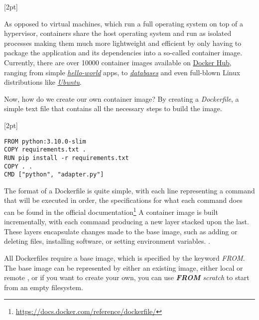 [2pt]

As opposed to virtual machines, which run a full operating system on top of a hypervisor, containers share the host operating system and run as isolated processes
making them much more lightweight and efficient by only having to package the application and its dependencies into a so-called container image.
Currently, there are over 10000 container images available on \href{https://hub.docker.com/}{Docker Hub}, ranging from simple \href{https://hub.docker.com/_/hello-world}{\textit{hello-world}} apps, to 
\href{https://hub.docker.com/search?categories=Databases+\%26+Storage}{\textit{databases}} and even full-blown Linux distributions like \href{https://hub.docker.com/_/ubuntu}{\textit{Ubuntu}}.

Now, how do we create our own container image? By creating a \textit{Dockerfile}, a simple text file that contains all the necessary steps to build the image.

[2pt]

\lstset{language=Dockerfile,caption=Sample Dockerfile,label=lst:ex-dockerfile}
\begin{lstlisting}
FROM python:3.10.0-slim
COPY requirements.txt .
RUN pip install -r requirements.txt
COPY . .
CMD ["python", "adapter.py"]    
\end{lstlisting}

The format of a Dockerfile is quite simple, with each line representing a command that will be executed in order, the specifications for what each command does can be found in the official documentation\footnote[1]{\href{https://docs.docker.com/reference/dockerfile/}{https://docs.docker.com/reference/dockerfile/}}
A container image is built incrementally, with each command producing a new layer stacked upon the last. These layers encapsulate changes made to the base image, such as adding or deleting files, installing software, or setting environment variables. \cite{image-layers}.


All Dockerfiles require a base image, which is specified by the keyword \textit{FROM}.
The base image can be represented by either an existing image, either local or remote , or if you want to create your own, you can use \textit{\textbf{FROM} scratch} to start from an empty filesystem.

